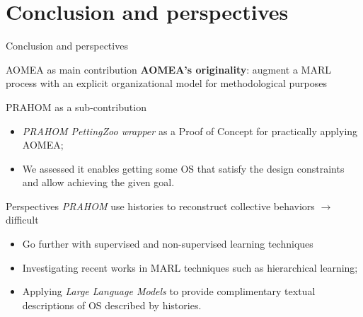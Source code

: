 \section{Conclusion and perspectives}
\begin{frame}{Conclusion and perspectives}
    {}

    \begin{prosblock}{AOMEA as main contribution}
        \textbf{AOMEA's originality}: augment a MARL process with an explicit organizational model for methodological purposes
    \end{prosblock}

    \begin{prosblock}{PRAHOM as a sub-contribution}

        \begin{itemize}
            \item \emph{PRAHOM PettingZoo wrapper} as a Proof of Concept for practically applying AOMEA;
            \item We assessed it enables getting some OS that satisfy the design constraints and allow achieving the given goal.
        \end{itemize}

    \end{prosblock}

    \begin{alertblock}{Perspectives}
        \emph{PRAHOM} use histories to reconstruct collective behaviors $\rightarrow$ difficult
        \begin{itemize}
            \item Go further with supervised and non-supervised learning techniques
            \item Investigating recent works in MARL techniques such as hierarchical learning;
            \item Applying \emph{Large Language Models} to provide complimentary textual descriptions of OS described by histories.
        \end{itemize}
    \end{alertblock}

\end{frame}
